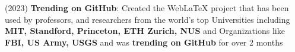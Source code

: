 (2023) \textbf{Trending on GitHub}{: Created the WebLaTeX project that has been used by professors, and researchers from the world's top Universities including \textbf{MIT, Standford, Princeton, ETH Zurich, NUS} and Organizations like \textbf{FBI, US Army, USGS} and was \textbf{trending on GitHub} for over 2 months} \\